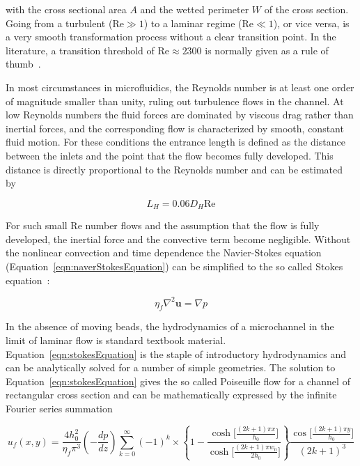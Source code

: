 with the cross sectional area $A$ and the wetted perimeter $W$ of the cross section. Going from a turbulent ($\text{Re} \gg 1$) to a laminar regime ($\text{Re} \ll 1$), or vice versa, is a very smooth transformation process without a clear transition point. In the literature, a transition threshold of $\text{Re} \approx 2300$ is normally given as a rule of thumb~\cite{Happel2012}.

In most circumstances in microfluidics, the Reynolds number is at least one order of magnitude smaller than unity, ruling out turbulence flows in the channel. At low Reynolds numbers the fluid forces are dominated by viscous drag rather than inertial forces, and the corresponding flow is characterized by smooth, constant fluid motion. For these conditions the entrance length is defined as the distance between the inlets and the point that the flow becomes fully developed. This distance is directly proportional to the Reynolds number and can be estimated by~\cite{Kays2012}

\begin{equation}
	L_{H} = 0.06 D_{H} \text{Re}
\end{equation}

For such small $\text{Re}$ number flows and the assumption that the flow is fully developed, the inertial force and the convective term become negligible. Without the nonlinear convection and time dependence the Navier-Stokes equation (Equation~\ref{eqn:naverStokesEquation}) can be simplified to the so called Stokes equation~\cite{Happel2012}: 

\begin{equation}
	\eta_{f} \nabla^{2}\mathbf{u} = \nabla p 
	\label{eqn:stokesEquation}
\end{equation}

In the absence of moving beads, the hydrodynamics of a microchannel in the limit of laminar flow is standard textbook material. Equation~\ref{eqn:stokesEquation} is the staple of introductory hydrodynamics and can be analytically solved for a number of simple geometries. The solution to Equation~\ref{eqn:stokesEquation} gives the so called Poiseuille flow for a channel of rectangular cross section and can be mathematically expressed by the infinite Fourier series summation~\cite{White2006}

\begin{equation}
	u_{f}(x,y) = \frac{4h_{0}^{2}}{\eta_{f}\pi^3}\left(-\frac{dp}{dz}\right)\sum_{k=0}^{\infty}(-1)^{k}\times\left\{ 1 - \frac{\cosh\Big[\frac{(2k+1)\pi x}{h_{0}}\Big]}{\cosh\Big[\frac{(2k+1)\pi w_{0}}{2h_{0}}\Big]} \right\} \frac{\cos\Big[\frac{(2k+1)\pi y}{h_{0}}\Big]}{(2k+1)^{3}}
	\label{eqn:velocityProfileRectangularDuct}
\end{equation}

